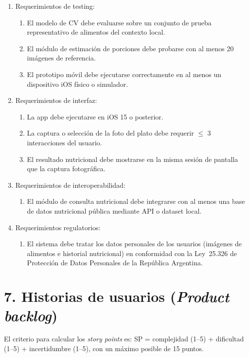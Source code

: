 \documentclass[
11pt, %
]{charter}
\begin{document}
\begin{enumerate}
	\item Requerimientos de testing:
		\begin{enumerate}
			\item[RT1] El modelo de CV debe evaluarse sobre un conjunto de prueba representativo de alimentos del contexto local.
			\item[RT2] El módulo de estimación de porciones debe probarse con al menos 20 imágenes de referencia.
			\item[RT3] El prototipo móvil debe ejecutarse correctamente en al menos un dispositivo iOS físico o simulador.
		\end{enumerate}
	\item Requerimientos de interfaz:
		\begin{enumerate}
			\item[RI1] La app debe ejecutarse en iOS 15 o posterior.
			\item[RI2] La captura o selección de la foto del plato debe requerir $\leq$ 3 interacciones del usuario.
			\item[RI3] El resultado nutricional debe mostrarse en la misma sesión de pantalla que la captura fotográfica.
		\end{enumerate}
	\item Requerimientos de interoperabilidad:
		\begin{enumerate}
			\item[RIO1] El módulo de consulta nutricional debe integrarse con al menos una base de datos nutricional pública mediante API o dataset local.
		\end{enumerate}
	\item Requerimientos regulatorios:
		\begin{enumerate}
			\item[RReg1] El sistema debe tratar los datos personales de los usuarios (imágenes de alimentos e historial nutricional) en conformidad con la Ley~25.326 de Protección de Datos Personales de la República Argentina.
		\end{enumerate}
\end{enumerate}

\section{7. Historias de usuarios (\textit{Product backlog})}
\label{sec:backlog}

El criterio para calcular los \textit{story points} es: SP = complejidad (1--5) + dificultad (1--5) + incertidumbre (1--5), con un máximo posible de 15 puntos.
\end{document}
